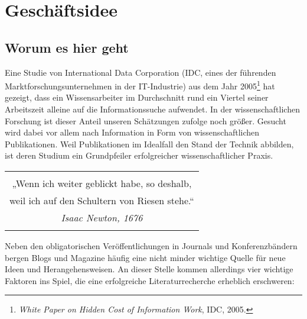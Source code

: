 \section{Geschäftsidee}


\subsection{Worum es hier geht}
Eine Studie von International Data Corporation (IDC, eines der führenden Marktforschungsunternehmen in der IT-Industrie) aus dem Jahr 2005\footnote[1]{\textit{White Paper on Hidden Cost of Information Work}, IDC, 2005.} hat gezeigt, dass ein Wissensarbeiter im Durchschnitt rund ein Viertel seiner Arbeitszeit alleine auf die Informationssuche aufwendet. In der wissenschaftlichen Forschung ist dieser Anteil unseren Schätzungen zufolge noch größer. Gesucht wird dabei vor allem nach Information in Form von wissenschaftlichen Publikationen. Weil Publikationen im Idealfall den Stand der Technik abbilden, ist deren Studium ein Grundpfeiler erfolgreicher wissenschaftlicher Praxis. 

\begin{table}[h!]
  \centering
  \begin{large}
	\begin{itshape}
  \begin{tabular}{c}\hline
	\\
  {\color{orange}„Wenn ich weiter geblickt habe, so deshalb,} \\ 
	{\color{orange}weil ich auf den Schultern von Riesen stehe.“} \\
	{\hfill \color{orange}\textit{Isaac Newton, 1676} } \\
	\\\hline
  \end{tabular}
	\end{itshape}
  \end{large}
\end{table}

Neben den obligatorischen Veröffentlichungen in Journals und Konferenzbändern bergen Blogs und Magazine häufig eine nicht minder wichtige Quelle für neue Ideen und Herangehensweisen. An dieser Stelle kommen allerdings vier wichtige Faktoren ins Spiel, die eine erfolgreiche Literaturrecherche erheblich erschweren: 

